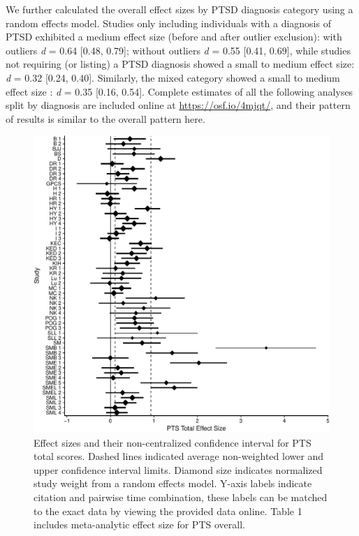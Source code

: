 \documentclass[man, mask]{apa6}
\theoremstyle{definition}
\theoremstyle{definition}
\theoremstyle{definition}
\theoremstyle{remark}
\begin{document}
We further calculated the overall effect sizes by PTSD diagnosis
category using a random effects model. Studies only including
individuals with a diagnosis of PTSD exhibited a medium effect size
(before and after outlier exclusion): with outliers \emph{d} = 0.64
{[}0.48, 0.79{]}; without outliers \emph{d} = 0.55 {[}0.41, 0.69{]},
while studies not requiring (or listing) a PTSD diagnosis showed a small
to medium effect size: \emph{d} = 0.32 {[}0.24, 0.40{]}. Similarly, the
mixed category showed a small to medium effect size : \emph{d} = 0.35
{[}0.16, 0.54{]}. Complete estimates of all the following analyses split
by diagnosis are included online at \url{https://osf.io/4mjqt/}, and
their pattern of results is similar to the overall pattern here.

\begin{figure}[htbp]
\centering
\includegraphics{meta_markdown_files/figure-latex/ptspicoverall-1.pdf}
\caption{\label{fig:ptspicoverall}Effect sizes and their non-centralized
confidence interval for PTS total scores. Dashed lines indicated average
non-weighted lower and upper confidence interval limits. Diamond size
indicates normalized study weight from a random effects model. Y-axis
labels indicate citation and pairwise time combination, these labels can
be matched to the exact data by viewing the provided data online. Table
1 includes meta-analytic effect size for PTS overall.}
\end{figure}
\end{document}
